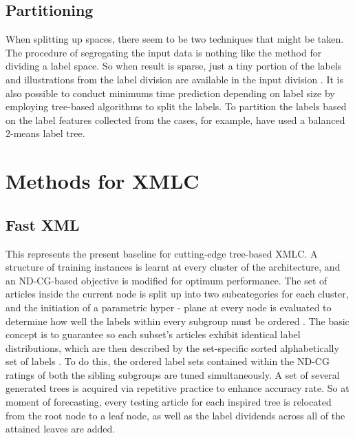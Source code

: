 \documentclass[a4paper]{article}
\begin{document}
\subsection{Partitioning}
When splitting up spaces, there seem to be two techniques that might be taken. The procedure of segregating the input data is nothing like the method for dividing a label space. So when result is sparse, just a tiny portion of the labels and illustrations from the label division are available in the input division \cite{bib7}. It is also possible to conduct minimums time prediction depending on label size by employing tree-based algorithms to split the labels. To partition the labels based on the label features collected from the cases, for example, have used a balanced 2-means label tree.

\section{Methods for XMLC}

\subsection{Fast XML}
This represents the present baseline for cutting-edge tree-based XMLC. A structure of training instances is learnt at every cluster of the architecture, and an ND-CG-based objective is modified for optimum performance. The set of articles inside the current node is split up into two subcategories for each cluster, and the initiation of a parametric hyper - plane at every node is evaluated to determine how well the labels within every subgroup must be ordered \cite{bib7}. The basic concept is to guarantee so each subset's articles exhibit identical label distributions, which are then described by the set-specific sorted alphabetically set of labels \cite{bib4}. To do this, the ordered label sets contained within the ND-CG ratings of both the sibling subgroups are tuned simultaneously. A set of several generated trees is acquired via repetitive practice to enhance accuracy rate. So at moment of forecasting, every testing article for each inspired tree is relocated from the root node to a leaf node, as well as the label dividends across all of the attained leaves are added.
\end{document}
